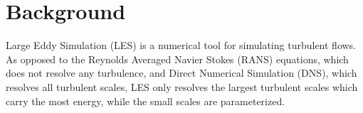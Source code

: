 \section{Background}

Large Eddy Simulation (LES) is a numerical tool for simulating turbulent flows. As opposed to the Reynolds Averaged Navier Stokes (RANS) equations, which does not resolve any turbulence, and Direct Numerical Simulation (DNS), which resolves all turbulent scales, LES only resolves the largest turbulent scales which carry the most energy, while the small scales are parameterized. 